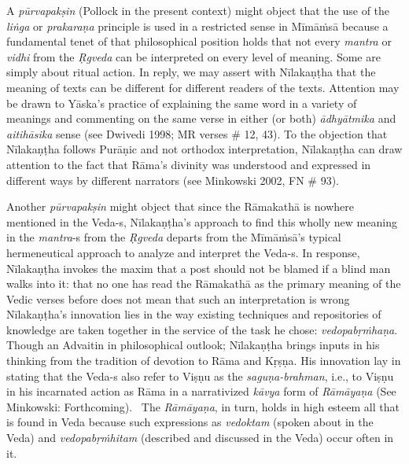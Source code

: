 \vskip 2pt

A \textit{pūrvapakṣin} (Pollock in the present context) might object that the use of the \textit{liṅga} or \textit{prakaraṇa} principle is used in a restricted sense in Mīmāṁsā because a fundamental tenet of that philosophical position holds that not every \textit{mantra} or \textit{vidhi} from the \textit{Ṛgveda} can be interpreted on every level of meaning. Some are simply about ritual action. In reply, we may assert with Nīlakaṇṭha that the meaning of texts can be different for different readers of the texts. Attention may be drawn to Yāska's practice of explaining the same word in a variety of meanings and commenting on the same verse in either (or both) \textit{ādhyātmika} and \textit{aitihāsika} sense (see Dwivedi 1998; MR verses \# 12, 43). To the objection that Nīlakaṇṭha follows Purāṇic and not orthodox interpretation, Nīlakaṇṭha can draw attention to the fact that Rāma's divinity was understood and expressed in different ways by different narrators (see Minkowski 2002, FN \# 93).

\vskip 2pt

Another \textit{pūrvapakṣin }might object that since the Rāmakathā is nowhere mentioned in the Veda-s, Nīlakaṇṭha’s approach to find this wholly new meaning in the \textit{mantra}-s from the \textit{Ṛgveda} departs from the Mīmāṁsā’s typical hermeneutical approach to analyze and interpret the Veda-s. In response, Nīlakaṇṭha invokes the maxim that a post should not be blamed if a blind man walks into it: that no one has read the Rāmakathā as the primary meaning of the Vedic verses before does not mean that such an interpretation is wrong Nīlakaṇṭha's innovation lies in the way existing techniques and repositories of knowledge are taken together in the service of the task he chose: \textit{vedopabṛṁhaṇa}. Though an Advaitin in philosophical outlook; Nīlakaṇṭha brings inputs in his thinking from the tradition of devotion to Rāma and Kṛṣṇa. His innovation lay in stating that the Veda-s also refer to Viṣṇu as the \textit{saguṇa-brahman}, i.e., to Viṣṇu in his incarnated action as Rāma in a narrativized \textit{kāvya} form of \textit{Rāmāyaṇa} (See Minkowski: Forthcoming).  The \textit{Rāmāyaṇa}, in turn, holds in high esteem all that is found in Veda because such expressions as \textit{vedoktam} (spoken about in the Veda) and \textit{vedopabṛṁhitam} (described and discussed in the Veda) occur often in it.


